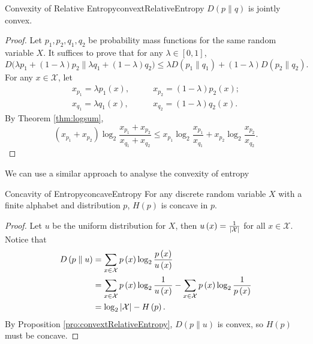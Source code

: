 \documentclass[math, code]{amznotes}
\theoremstyle{remark}
\begin{document}
\begin{probox}{Convexity of Relative Entropy}{convextRelativeEntropy}
    $D\left(p \parallel q\right)$ is jointly convex.
    \tcblower
    \begin{proof}
        Let $p_1, p_2, q_1, q_2$ be probability mass functions for the same random variable $X$. It suffices to prove that for any $\lambda \in \left[0, 1\right]$,
        \begin{equation*}
            D\bigl(\lambda p_1 + \left(1 - \lambda\right)p_2 \parallel \lambda q_1 + \left(1 - \lambda\right)q_2\bigr) \leq \lambda D\left(p_1 \parallel q_1\right) + \left(1 - \lambda\right)D\left(p_2 \parallel q_2\right).
        \end{equation*}
        For any $x \in \mathcal{X}$, let 
        \begin{align*}
            x_{p_1} = \lambda p_1\left(x\right), & \qquad x_{p_2} = \left(1- \lambda\right)p_2\left(x\right); \\
            x_{q_1} = \lambda q_1\left(x\right), & \qquad x_{q_2} = \left(1- \lambda\right)q_2\left(x\right).
        \end{align*}
        By Theorem \ref{thm:logsum},
        \begin{equation*}
            \left(x_{p_1} + x_{p_2}\right)\log_2\frac{x_{p_1} + x_{p_2}}{x_{q_1} + x_{q_2}} \leq x_{p_1}\log_2\frac{x_{p_1}}{x_{q_1}} + x_{p_2}\log_2\frac{x_{p_2}}{x_{q_2}}.
        \end{equation*}
    \end{proof}
\end{probox}
We can use a similar approach to analyse the convexity of entropy
\begin{probox}{Concavity of Entropy}{concaveEntropy}
    For any discrete random variable $X$ with a finite alphabet and distribution $p$, $H\left(p\right)$ is concave in $p$.
    \tcblower
    \begin{proof}
        Let $u$ be the uniform distribution for $X$, then $u\left(x\right) = \frac{1}{{\left\lvert {\mathcal{X}} \right\rvert}}$ for all $x \in \mathcal{X}$. Notice that 
        \begin{align*}
            D\left(p \parallel u\right) & = \sum_{x \in \mathcal{X}}p\left(x\right)\log_2\frac{p\left(x\right)}{u\left(x\right)} \\
            & = \sum_{x \in \mathcal{X}}p\left(x\right)\log_2\frac{1}{u\left(x\right)} - \sum_{x \in \mathcal{X}}p\left(x\right)\log_2\frac{1}{p\left(x\right)} \\
            & = \log_2{\left\lvert {\mathcal{X}} \right\rvert} - H\left(p\right).
        \end{align*}
        By Proposition \ref{pro:convextRelativeEntropy}, $D\left(p \parallel u\right)$ is convex, so $H\left(p\right)$ must be concave.
    \end{proof}
\end{probox}
\end{document}
